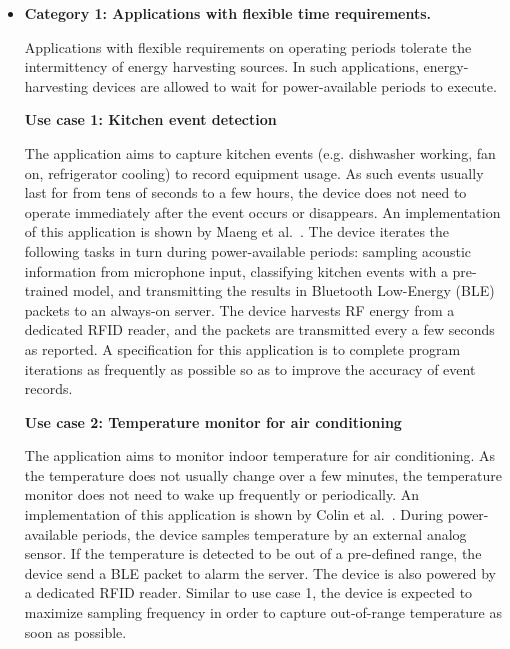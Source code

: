 \begin{itemize}

  \item \textbf{Category 1: Applications with flexible time requirements.}
  
  Applications with flexible requirements on operating periods tolerate the intermittency of energy harvesting sources. In such applications, energy-harvesting devices are allowed to wait for power-available periods to execute.

  \textbf{Use case 1: Kitchen event detection} 
  
  The application aims to capture kitchen events (e.g. dishwasher working, fan on, refrigerator cooling) to record equipment usage. As such events usually last for from tens of seconds to a few hours, the device does not need to operate immediately after the event occurs or disappears. An implementation of this application is shown by Maeng et al.~\cite{maeng2019supporting}. The device iterates the following tasks in turn during power-available periods: sampling acoustic information from microphone input, classifying kitchen events with a pre-trained model, and transmitting the results in Bluetooth Low-Energy (BLE) packets to an always-on server. The device harvests RF energy from a dedicated RFID reader, and the packets are transmitted every a few seconds as reported. A specification for this application is to complete program iterations as frequently as possible so as to improve the accuracy of event records. 

  \textbf{Use case 2: Temperature monitor for air conditioning}

  The application aims to monitor indoor temperature for air conditioning. As the temperature does not usually change over a few minutes, the temperature monitor does not need to wake up frequently or periodically. An implementation of this application is shown by Colin et al.~\cite{colin2018reconfigurable}. During power-available periods, the device samples temperature by an external analog sensor. If the temperature is detected to be out of a pre-defined range, the device send a BLE packet to alarm the server. The device is also powered by a dedicated RFID reader. Similar to use case 1, the device is expected to maximize sampling frequency in order to capture out-of-range temperature as soon as possible.


\end{itemize}
